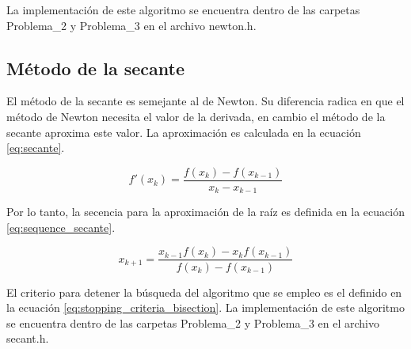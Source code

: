 La implementación de este algoritmo se encuentra dentro de las carpetas \textcolor{citecolor}{Problema\_2} y \textcolor{citecolor}{Problema\_3} en el archivo \textcolor{title}{newton.h}.

\subsection*{Método de la secante}

El método de la secante es semejante al de Newton. Su diferencia radica en que el método de Newton necesita el valor de la derivada, en cambio el método de la secante aproxima este valor. La aproximación es calculada en la ecuación \ref{eq:secante}.

\begin{equation}
    f'(x_k) = \frac{f(x_k)-f(x_{k-1})}{x_{k}-x_{k-1}}
    \label{eq:secante}
\end{equation}

Por lo tanto, la secencia para la aproximación de la raíz es definida en la ecuación \ref{eq:sequence_secante}.

\begin{equation}
    x_{k+1} = \frac{x_{k-1}f(x_k)-x_kf(x_{k-1})}{f(x_k)-f(x_{k-1})}
    \label{eq:sequence_secante}
\end{equation}

El criterio para detener la búsqueda del algoritmo que se empleo es el definido en la ecuación \ref{eq:stopping_criteria_bisection}. La implementación de este algoritmo se encuentra dentro de las carpetas \textcolor{citecolor}{Problema\_2} y \textcolor{citecolor}{Problema\_3} en el archivo \textcolor{title}{secant.h}.